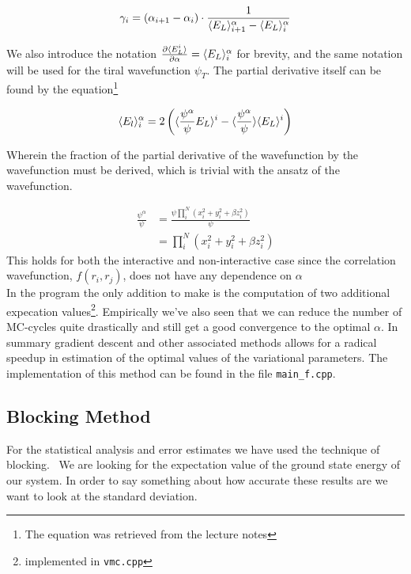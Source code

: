 \begin{equation}
\gamma_i = (\alpha_{i+1} - \alpha_i) \cdot \frac{1}{\langle E_L \rangle^\alpha_{i+1} - \langle E_L \rangle^\alpha_i}
\end{equation}

\noindent We also introduce the notation $\frac{\partial \langle E_L^i \rangle}{\partial \alpha} = \langle E_L \rangle^\alpha_{i}$ for brevity, and the same notation will be used for the tiral wavefunction $\psi_T$. The partial derivative itself can be found by the equation\footnote{The equation was retrieved from the lecture notes} 

\begin{equation}
\langle E_l \rangle^\alpha_{i} = 2 \left(\langle \frac{\psi^\alpha}{\psi} E_L \rangle^i - \langle \frac{\psi^\alpha}{\psi} \rangle\langle E_L \rangle^i \right)
\end{equation} 

\noindent Wherein the fraction of the partial derivative of the wavefunction by the wavefunction must be derived, which is trivial with the ansatz of the wavefunction. 


\begin{align}
\frac{\psi^\alpha}{\psi} &= \frac{\psi \prod_i^N (x_i^2 + y_i^2 + \beta z^2_i)}{\psi} \\
&= \prod_i^N (x_i^2 + y_i^2 + \beta z^2_i)
\end{align}
\noindent This holds for both the interactive and non-interactive case since the correlation wavefunction, $f(r_i, r_j)$, does not have any dependence on $\alpha$\\
In the program the only addition to make is the computation of two additional expecation values\footnote{implemented in \lstinline{vmc.cpp}}. Empirically we've also seen that we can reduce the number of MC-cycles quite drastically and still get a good convergence to the optimal $\alpha$. In summary gradient descent and other associated methods allows for a radical speedup in estimation of the optimal values of the variational parameters. The implementation of this method can be found in the file \lstinline{main_f.cpp}.


\subsection{Blocking Method}

For the statistical analysis and error estimates we have used the technique of blocking. \
We are looking for the expectation value of the ground state energy of our system. In order to say something about how accurate these results are we want to look at the standard deviation. 

